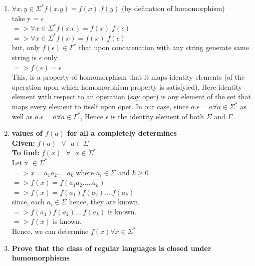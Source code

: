 \documentclass{article}
\begin{document}
\begin{enumerate}
    \item {}
    
    $\forall x,y \in \Sigma^{*} f(x.y) = f(x).f(y)$ (by defination of homomorphism)\\
    take y = $\epsilon$\\
    $=> \forall x \in \Sigma^{*} f(x.\epsilon) = f(x).f(\epsilon)$\\
    $=> \forall x \in \Sigma^{*} f(x) = f(x).f(\epsilon)$\\
    but, only $f(\epsilon) \in \Gamma^{*}$ that upon concatenation with any string generate same string is $\epsilon$ only\\
    $=> f(\epsilon) =\epsilon$\\

    This, is a property of homomorphism that it maps identity elements (of the operation upon which homomorphism property is satisfyied). Here identity element with respect to an operation (say oper) is any element of the set that maps
    every element to itself upon oper.
    In our case, since $a.\epsilon = a \forall a \in \Sigma^{*} $ as well as $a.\epsilon = a \forall a \in \Gamma^{*} $, Hence $\epsilon$ is the identity element of both $\Sigma$ and $\Gamma$

    \item \textbf{values of $f(a)$ for all a \boldsymbol{$\in \Sigma$} completely determines }\\
    
    \textbf{Given: } $f(a) \text{ } \forall \text{ }  a \in \Sigma$\\
    \textbf{To find: } $f(x) \text{ } \forall \text{ }  x \in \Sigma^{*}$\\

    Let x $\in \Sigma^{*}$\\
    $=> x = a_1 a_2 ..... a_k$ where $a_i \in \Sigma $ and $k \geq 0$\\
    $=> f(x) = f(a_1 a_2 ..... a_k)$\\
    $=> f(x) = f(a_1)f(a_2)....f(a_k)$\\
    since, each $a_i \in \Sigma$ hence, they are known.\\
    $=> f(a_1)f(a_2)....f(a_k)$ is known.\\
    $=> f(x) $ is known.\\
    Hence, we can determine $f(x) \forall x \in \Sigma^{*}$

    \pagebreak
    \item \textbf{Prove that the class of regular languages is closed under homomorphisms}


\end{enumerate}
\end{document}
